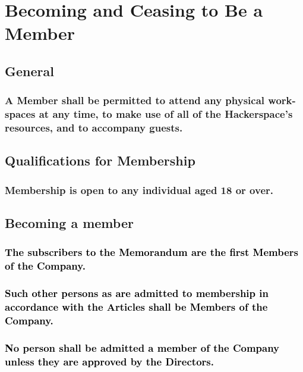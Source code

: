 \documentclass[12pt]{article}
\def\fakecolour{black}
\begin{document}
\section*{Becoming and Ceasing to Be a Member}
  
\subsection{General}
\subsubsection[Members' Access to Resources]{A Member shall be permitted to attend any physical work-spaces at any time, to make use of all of the Hackerspace's resources, and to accompany guests.}

\subsection{Qualifications for Membership}
\subsubsection[Membership 18 and Above]{Membership is open to any individual aged 18 or over.}

\subsection{Becoming a member}
\subsubsection[First Members of the Company]{\textcolor{\fakecolour}{The subscribers to the Memorandum are the first Members of the Company.}}
\subsubsection[Members Are Admitted in Accordance with Articles]{\textcolor{\fakecolour}{Such other persons as are admitted to membership in accordance with the Articles shall be Members of the Company.}}
\subsubsection[Potential Members Must Be Approved by Directors]{\textcolor{\fakecolour}{No person shall be admitted a member of the Company unless they are approved by the Directors.}}
\end{document}
